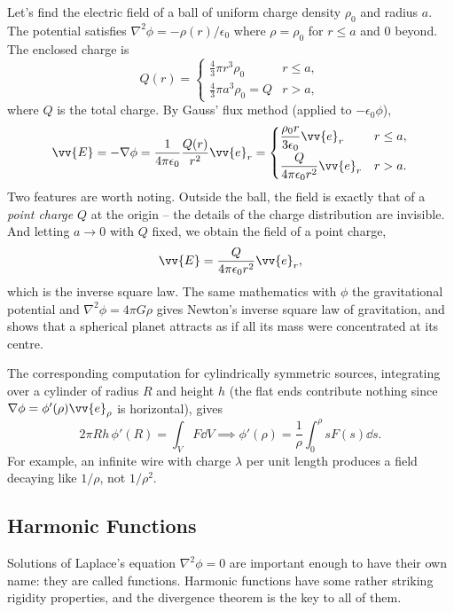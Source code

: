 \begin{example}
	Let's find the electric field of a ball of uniform charge density $\rho_0$ and radius $a$. The potential satisfies $\nabla^2 \phi = -\rho(r)/\epsilon_0$ where $\rho = \rho_0$ for $r \leq a$ and $0$ beyond. The enclosed charge is
	$$
	Q(r) = \begin{cases}
		\frac{4}{3}\pi r^3 \rho_0 & r \leq a, \\
		\frac{4}{3}\pi a^3 \rho_0 = Q & r > a,
	\end{cases}
	$$
	where $Q$ is the total charge. By Gauss' flux method (applied to $-\epsilon_0 \phi$),
	$$
	\vv{E} = -\nabla \phi = \frac{1}{4 \pi \epsilon_0}\frac{Q(r)}{r^2} \vv{e}_r = \begin{cases}
		\dfrac{\rho_0 r}{3 \epsilon_0} \vv{e}_r & r \leq a, \\[6pt]
		\dfrac{Q}{4 \pi \epsilon_0 r^2} \vv{e}_r & r > a.
	\end{cases}
	$$
	Two features are worth noting. Outside the ball, the field is exactly that of a \emph{point charge} $Q$ at the origin -- the details of the charge distribution are invisible. And letting $a \to 0$ with $Q$ fixed, we obtain the field of a point charge,
	$$
	\vv{E} = \frac{Q}{4 \pi \epsilon_0 r^2} \vv{e}_r,
	$$
	which is the inverse square law. The same mathematics with $\phi$ the gravitational potential and $\nabla^2 \phi = 4 \pi G \rho$ gives Newton's inverse square law of gravitation, and shows that a spherical planet attracts as if all its mass were concentrated at its centre.
\end{example}

The corresponding computation for cylindrically symmetric sources, integrating over a cylinder of radius $R$ and height $h$ (the flat ends contribute nothing since $\nabla \phi = \phi'(\rho) \vv{e}_\rho$ is horizontal), gives
$$
2 \pi R h \, \phi'(R) = \int_V F \dd V \implies \phi'(\rho) = \frac{1}{\rho}\int_0^\rho s F(s) \dd s.
$$
For example, an infinite wire with charge $\lambda$ per unit length produces a field decaying like $1/\rho$, not $1/\rho^2$.

\subsection{Harmonic Functions}

Solutions of Laplace's equation $\nabla^2 \phi = 0$ are important enough to have their own name: they are called  functions. Harmonic functions have some rather striking rigidity properties, and the divergence theorem is the key to all of them.

